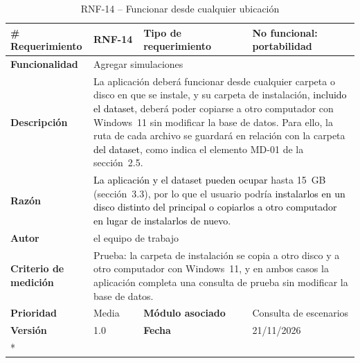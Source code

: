 \begin{longtable}{|p{\rqA}|p{\rqB}|p{\rqC}|p{\rqD}|}
  \caption{RNF-14 -- Funcionar desde cualquier ubicación}\label{tab:rnf-14}\tabularnewline
  \hline
  \textbf{\# Requerimiento} & RNF-14 & \raggedright\textbf{Tipo de requerimiento} & No funcional: portabilidad\tabularnewline\hline
  \raggedright\textbf{Funcionalidad} & \multicolumn{3}{p{\rqBCD}|}{Agregar simulaciones}\tabularnewline\hline
  \endfirsthead
  \textbf{Descripción} & \multicolumn{3}{p{\rqBCD}|}{La aplicación deberá funcionar desde cualquier carpeta o disco en que se instale, y su carpeta de instalación, \textcolor{black}{incluido el dataset}, deberá poder copiarse a otro computador con Windows~11 sin modificar la base de datos. Para ello, la ruta de cada archivo se guardará en relación con la carpeta \textcolor{black}{del dataset}, como indica el elemento MD-01 de la sección~2.5.}\tabularnewline\hline
  \textbf{Razón} & \multicolumn{3}{p{\rqBCD}|}{\textcolor{black}{La aplicación y el dataset pueden ocupar} hasta 15~GB (sección~3.3), por lo que el usuario podría \textcolor{black}{instalarlos en un disco distinto del principal o copiarlos a otro computador en lugar de instalarlos de nuevo}.}\tabularnewline\hline
  \textbf{Autor} & \multicolumn{3}{p{\rqBCD}|}{el equipo de trabajo}\tabularnewline\hline
  \raggedright\textbf{Criterio de medición} & \multicolumn{3}{p{\rqBCD}|}{Prueba: la carpeta de instalación se copia a otro disco y a otro computador con Windows~11, y en ambos casos la aplicación completa una consulta de prueba sin modificar la base de datos.}\tabularnewline\hline
  \textbf{Prioridad} & Media & \raggedright\textbf{Módulo asociado} & Consulta de escenarios\tabularnewline\hline
  \textbf{Versión} & 1.0 & \textbf{Fecha} & 21/11/2026\tabularnewline*\cline{1-4}
\end{longtable}